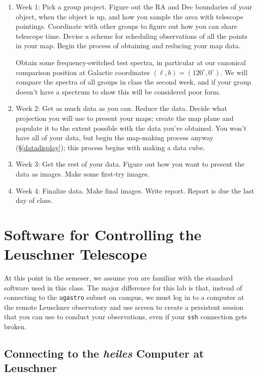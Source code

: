 \documentclass[psfig,preprint]{aastex}
\begin{document}
\begin{enumerate}

\item Week 1: Pick a group project. Figure out the RA and
  Dec boundaries of your object, when the object is up, and how you
  sample the area with telescope pointings. Coordinate with other groups
  to figure out how you can share telescope time.
Devise a scheme for scheduling observations of all the points in your
map.  Begin the process of obtaining and reducing your map data. 

Obtain some frequency-switched test spectra, in
particular at our canonical comparison position at Galactic coordinates
$(\ell, b) = (120^\circ, 0^\circ)$.  We will compare the spectra of all
groups in class the second week, and if your group doesn't have a
spectrum to show this will be considered poor form.

\item Week 2: Get as much data as you can. Reduce the data.  Decide what
  projection you will use to present your maps; create the map plane and
  populate it to the extent possible with the data you've obtained.  You
  won't have all of your data, but begin the map-making process anyway
  (\S \ref{datadisplay}); this process begins with making a data cube.

\item Week 3: Get the rest of your data. Figure out
  how you want to present the data as images. Make some first-try
  images. 

\item Week 4: Finalize data. Make final images. Write
report. Report is due the last day of class.

\end{enumerate}

\section{Software for Controlling the Leuschner Telescope}

\noindent
At this point in the semeser, we assume you are familiar with
the standard software used in this class. The major difference
for this lab is that, instead of connecting to the {\tt ugastro}
subnet on campus, we must log in to a computer at the  remote 
Leuschner observatory and use screen to create a persistent
session that you can use to conduct your observations, even
if your {\tt ssh} connection gets broken.

\subsection {Connecting to the {\it heiles} Computer at Leuschner}
\end{document}
